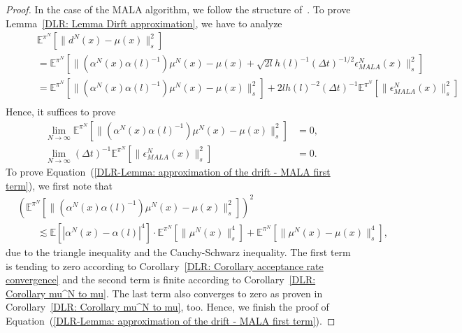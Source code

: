 \begin{proof}
 In the case of the MALA algorithm, we follow the structure of~\autocite[Lemma 4.7]{Pillai2012}. To prove Lemma~\ref{DLR: Lemma Dirft approximation}, we have to analyze
 \begin{align*}
    & \mathbb{E}^{\pi^N}[ \|  d^N(x) - \mu(x) \|_{s}^2 ] \\
    \qquad & =  \mathbb{E}^{\pi^N}[ \|  ( \alpha^N(x) \alpha(l)^{-1} ) \mu^N(x) - \mu(x)+ \sqrt{2l}h(l)^{-1} (\Delta t)^{-1/2} \epsilon_{MALA}^N (x) \|_{s}^2 ] \\
    \qquad & = \mathbb{E}^{\pi^N}[ \|  ( \alpha^N(x) \alpha(l)^{-1} ) \mu^N(x) - \mu(x)\|_{s}^2]  + 2lh(l)^{-2} (\Delta t)^{-1} \mathbb{E}^{\pi^N}[ \| \epsilon_{MALA}^N (x) \|_{s}^2 ] \\
 \end{align*}
 Hence, it suffices to prove
 \begin{align}
   \label{DLR-Lemma: approximation of the drift - MALA first term}
   \lim_{N \to \infty} \mathbb{E}^{\pi^N}[ \|  ( \alpha^N(x) \alpha(l)^{-1} ) \mu^N(x) - \mu(x)\|_{s}^2] & = 0, \\
   \label{DLR-Lemma: approximation of the drift - MALA second term}
   \lim_{N \to \infty} (\Delta t)^{-1} \mathbb{E}^{\pi^N}[ \| \epsilon_{MALA}^N (x) \|_{s}^2 ] & = 0.
 \end{align}
 To prove Equation~(\ref{DLR-Lemma: approximation of the drift - MALA first term}), we first note that 
 \begin{align*}
  & \left( \mathbb{E}^{\pi^N}[ \|  ( \alpha^N(x) \alpha(l)^{-1} ) \mu^N(x) - \mu(x)\|_{s}^2] \right)^2 \\
  & \qquad \lesssim \mathbb{E}[|\alpha^N(x) - \alpha(l)|^4] \cdot  \mathbb{E}^{\pi^N}[ \|  \mu^N(x) \|_{s}^4] +  \mathbb{E}^{\pi^N}[ \|  \mu^N(x) - \mu(x)\|_{s}^4],
 \end{align*}
 due to the triangle inequality and the Cauchy-Schwarz inequality. The first term is tending to zero according to Corollary~\ref{DLR: Corollary acceptance rate convergence} and the second term is finite according to Corollary~\ref{DLR: Corollary mu^N to mu}. The last term also converges to zero as proven in Corollary~\ref{DLR: Corollary mu^N to mu}, too. Hence, we finish the proof of Equation~(\ref{DLR-Lemma: approximation of the drift - MALA first term}).
 

\end{proof}
